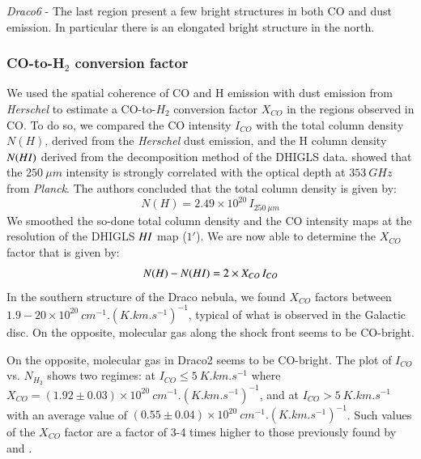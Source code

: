 \documentclass[traditabstract]{aa}
\begin{document}
\noindent \textit{Draco6} - The last region present a few bright structures in both CO and dust emission. In particular there is an elongated bright structure in the north.


      \subsubsection{CO-to-H$_2$ conversion factor}

   We used the spatial coherence of CO and H emission with dust emission from \emph{Herschel} to estimate a CO-to-$H_2$ conversion factor $X_{CO}$ in the regions observed in CO. To do so, we compared the CO intensity $I_{CO}$ with the total column density $N(H)$, derived from the \emph{Herschel} dust emission, and the H column density $N(H\rmnum{1})$ derived from the decomposition method of the DHIGLS data. \cite{MAMD_2017b} showed that the $250\: \mu m$ intensity is strongly correlated with the optical depth at $353\: GHz$ from \emph{Planck}. The authors concluded that the total column density is given by:
\begin{equation}
  N(H)=2.49\times 10^{20}\, I_{250\: \mu m}
\end{equation}
We smoothed the so-done total column density and the CO intensity maps at the resolution of the DHIGLS $H\rmnum{1}$ map ($1'$). We are now able to determine the $X_{CO}$ factor that is given by:
\begin{equation}
  N(H)-N(H\rmnum{1})=2\times X_{CO}\, I_{CO}
\end{equation}
In the southern structure of the Draco nebula, we found $X_{CO}$ factors between $1.9-20\times 10^{20}\: cm^{-1}.(K.km.s^{-1})^{-1}$, typical of what is observed in the Galactic disc\citep{Bolatto_2013}.
On the opposite, molecular gas along the shock front seems to be CO-bright.

On the opposite, molecular gas in Draco2 seems to be CO-bright. The plot of $I_{CO}$ vs. $N_{H_2}$ shows two regimes: at $I_{CO}\leq 5\: K.km.s^{-1}$ where $X_{CO}=(1.92\pm 0.03)\times 10^{20}\: cm^{-1}.(K.km.s^{-1})^{-1}$, and at $I_{CO}>5\: K.km.s^{-1}$ with an average value of $(0.55\pm 0.04)\times 10^{20}\: cm^{-1}.(K.km.s^{-1})^{-1}$.
Such values of the $X_{CO}$ factor are a factor of 3-4 times higher to those previously found by \cite{Herbstmeier_1993} and \cite{Moritz_1998}.
\end{document}

